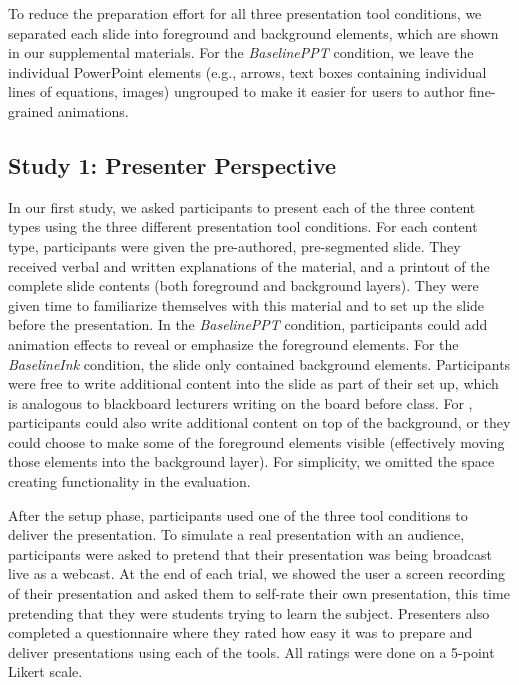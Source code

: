 To reduce the preparation effort for all three presentation tool conditions, we separated each slide into foreground and background elements, which are shown in our supplemental materials. For the \textit{BaselinePPT} condition, we leave the individual PowerPoint elements (e.g., arrows, text boxes containing individual lines of equations, images) ungrouped to make it easier for users to author fine-grained animations. 
%

\subsection{Study 1: Presenter Perspective}
In our first study, we asked participants to present each of the three content types using the three different presentation tool conditions. 
%
For each content type, participants were given the pre-authored, pre-segmented slide. 
They received verbal and written explanations of the material, and a printout of the complete slide contents (both foreground and background layers). They were given time to familiarize themselves with this material and to set up the slide before the presentation.
%
In the \textit{BaselinePPT} condition, participants could add animation effects to reveal or emphasize the foreground elements. For the \textit{BaselineInk} condition, the slide only contained background elements. Participants were free to write additional content into the slide as part of their set up, which is analogous to blackboard lecturers writing on the board before class. For \interface, participants could also write additional content on top of the background, or they could choose to make some of the foreground elements visible (effectively moving those elements into the background layer). For simplicity, we omitted the space creating functionality in the evaluation. 

After the setup phase, participants used one of the three tool conditions to deliver the presentation. 
%
To simulate a real presentation with an audience, participants were asked to pretend that their presentation was being broadcast live as a webcast. At the end of each trial, we showed the user a screen recording of their presentation and asked them to self-rate their own presentation, this time pretending that they were students trying to learn the subject. Presenters also completed a questionnaire where they rated how easy it was to prepare and deliver presentations using each of the tools. All ratings were done on a 5-point Likert scale.

